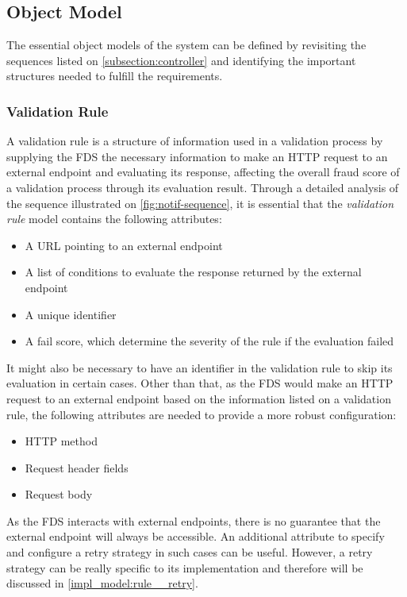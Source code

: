 \subsection{Object Model}
  \label{subsection:model}

  The essential object models of the system can be defined by revisiting the sequences listed on \autoref{subsection:controller} and identifying the important structures needed to fulfill the requirements.
  
  \subsubsection{Validation Rule}
    \label{subsub:rule}

    A validation rule is a structure of information used in a validation process by supplying the FDS the necessary information to make an HTTP request to an external endpoint and evaluating its response, affecting the overall fraud score of a validation process through its evaluation result. Through a detailed analysis of the sequence illustrated on \autoref{fig:notif-sequence}, it is essential that the \emph{validation rule} model contains the following attributes:

    \begin{itemize}
      \item A URL pointing to an external endpoint
      \item A list of conditions to evaluate the response returned by the external endpoint
      \item A unique identifier
      \item A fail score, which determine the severity of the rule if the evaluation failed
    \end{itemize}

    It might also be necessary to have an identifier in the validation rule to skip its evaluation in certain cases. Other than that, as the FDS would make an HTTP request to an external endpoint based on the information listed on a validation rule, the following attributes are needed to provide a more robust configuration:

    \begin{itemize}
      \item HTTP method 
      \item Request header fields
      \item Request body
    \end{itemize}

    As the FDS interacts with external endpoints, there is no guarantee that the external endpoint will always be accessible. An additional attribute to specify and configure a retry strategy in such cases can be useful. However, a retry strategy can be really specific to its implementation and therefore will be discussed in \autoref{impl_model:rule__retry}.

